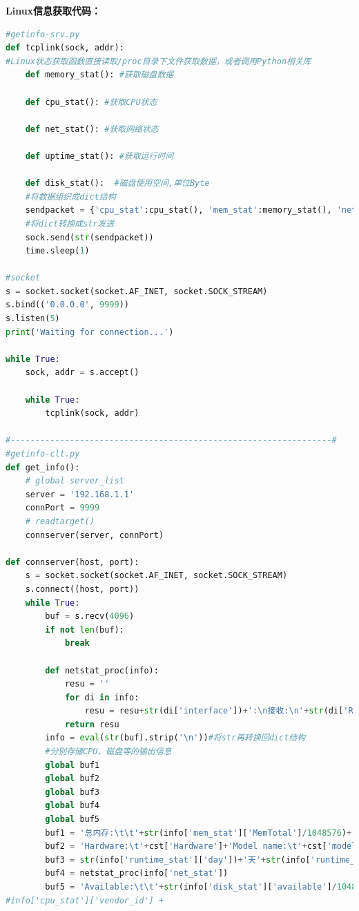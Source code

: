 \documentclass{itecreport-zh}
\begin{document}
\textbf{Linux信息获取代码：}
\begin{lstlisting}[language=Python]
#getinfo-srv.py
def tcplink(sock, addr):
#Linux状态获取函数直接读取/proc目录下文件获取数据，或者调用Python相关库
    def memory_stat(): #获取磁盘数据

    def cpu_stat(): #获取CPU状态

    def net_stat(): #获取网络状态

    def uptime_stat(): #获取运行时间

    def disk_stat():  #磁盘使用空间,单位Byte
    #将数据组织成dict结构
    sendpacket = {'cpu_stat':cpu_stat(), 'mem_stat':memory_stat(), 'net_stat':net_stat(), 'runtime_stat':uptime_stat(), 'disk_stat':disk_stat()}
    #将dict转换成str发送
    sock.send(str(sendpacket))
    time.sleep(1)

#socket
s = socket.socket(socket.AF_INET, socket.SOCK_STREAM)
s.bind(('0.0.0.0', 9999))
s.listen(5)
print('Waiting for connection...')

while True:
    sock, addr = s.accept()
    
    while True:
        tcplink(sock, addr)

#-----------------------------------------------------------------#
#getinfo-clt.py
def get_info():
    # global server_list
    server = '192.168.1.1'
    connPort = 9999
    # readtarget()
    connserver(server, connPort)

def connserver(host, port):
    s = socket.socket(socket.AF_INET, socket.SOCK_STREAM)
    s.connect((host, port))
    while True:
        buf = s.recv(4096)
        if not len(buf):
            break

        def netstat_proc(info):
            resu = ''
            for di in info:
                resu = resu+str(di['interface'])+':\n接收:\n'+str(di['ReceiveBytes']/1048576)+'MB\t\t'+str(di['ReceivePackets'])+'Packets\n发送:\n'+str(di['TransmitBytes']/1048576)+'MB\t\t'+str(di['TransmitPackets'])+'Packets\n\n'
            return resu
        info = eval(str(buf).strip('\n'))#将str再转换回dict结构
        #分别存储CPU、磁盘等的输出信息
        global buf1
        global buf2
        global buf3
        global buf4
        global buf5
        buf1 = '总内存:\t\t'+str(info['mem_stat']['MemTotal']/1048576)+'MB\n剩余内存:\t\t'+str(info['mem_stat']['MemFree']/1048576)+'MB'
        buf2 = 'Hardware:\t'+cst['Hardware']+'Model name:\t'+cst['model name']+'CPU implementer:\t'+cst['CPU implementer']+'CPU architecture:\t'+cst['CPU architecture']+'Features:\t'+cst['Features']
        buf3 = str(info['runtime_stat']['day'])+'天'+str(info['runtime_stat']['hour'])+'时'+str(info['runtime_stat']['minute'])+'分'+str(info['runtime_stat']['second'])+'秒'#).strip('\n')
        buf4 = netstat_proc(info['net_stat'])
        buf5 = 'Available:\t\t'+str(info['disk_stat']['available']/1048576)+'GB\nUsed:\t\t'+str(info['disk_stat']['used']/1048576)+'GB\nCapacity:\t\t'+str(info['disk_stat']['capacity']/1048576)+'GB'
#info['cpu_stat']['vendor_id'] + 


\end{lstlisting}
\end{document}
